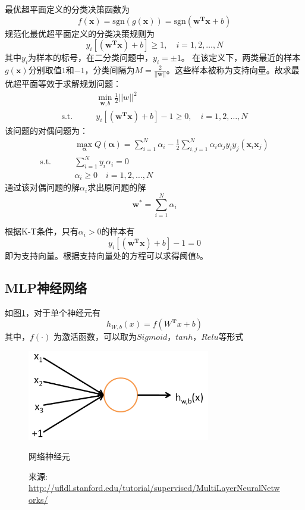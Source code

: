 最优超平面定义的分类决策函数为
\begin{equation}
f(\boldsymbol{x})=\mathrm{sgn}(g(\boldsymbol{x}))=\mathrm{sgn}(\boldsymbol{w}^\mathbf{T} \boldsymbol{x} + b)
\end{equation}
规范化最优超平面定义的分类决策规则为
\begin{equation}
y_i[(\boldsymbol{w}^\mathbf{T} \boldsymbol{x}) + b]\geq 1, \quad i=1,2,\dots ,N
\end{equation}
其中$y_i$为样本的标号，在二分类问题中，$y_i=\pm 1$。
在该定义下，两类最近的样本$g(\boldsymbol{x})$分别取值$1$和$-1$，分类间隔为$M=\frac2{||\boldsymbol{w}||}$。这些样本被称为{\hei 支持向量}。故求最优超平面等效于求解规划问题：
\begin{align}
& \min_{\boldsymbol{w},b}\frac12||w||^2\\
\text{s.t.}\qquad & y_i[(\boldsymbol{w}^\mathbf{T} \boldsymbol{x}) + b]-1\geq 0, \quad i=1,2,\dots , N
\end{align}
该问题的对偶问题为：
\begin{align}
& \max_{\boldsymbol{\alpha}}Q(\boldsymbol{\alpha})=\sum_{i=1}^N\alpha_i-\frac12\sum_{i,j=1}^N\alpha_i\alpha_jy_iy_j(\boldsymbol{x}_i\boldsymbol{x}_j)\\
\text{s.t.} \qquad &\sum_{i=1}^N
y_i\alpha_i=0\\
& \alpha_i\geq 0 \quad i=1,2,\dots ,N
\end{align}
通过该对偶问题的解$\alpha_i$求出原问题的解
\begin{equation}
\boldsymbol{w}^*=\sum_{i=1}^N\alpha_i
\end{equation}

根据K-T条件，只有$\alpha_i>0$的样本有
\begin{equation}
y_i[(\boldsymbol{w}^\mathbf{T} \boldsymbol{x}) + b]-1= 0
\end{equation}
即为支持向量。根据支持向量处的方程可以求得阈值$b$。

\subsection{MLP神经网络}
如图\ref{fig:sn}，对于单个神经元有
\begin{equation}
h_{W,b}(x)=f(W^\mathbf{T}x+b)
\end{equation}
其中，$f(\cdot)$ 为激活函数，可以取为$Sigmoid$，$tanh$，$Relu$等形式
\begin{figure}[htbp]
\centering
\includegraphics[width=8cm]{resource/SingleNeuron.png}
\caption{网络神经元}
\caption*{\small 来源: \url{http://ufldl.stanford.edu/tutorial/supervised/MultiLayerNeuralNetworks/}}
\label{fig:sn}
\end{figure}


